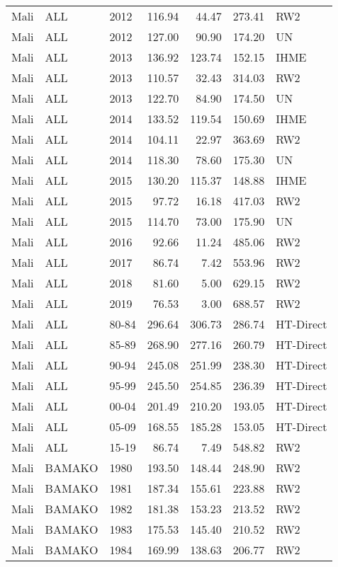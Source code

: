 \begin{longtable}{lllrrrl}
  Mali & ALL & 2012 & 116.94 & 44.47 & 273.41 & RW2 \\ 
  Mali & ALL & 2012 & 127.00 & 90.90 & 174.20 & UN \\ 
  Mali & ALL & 2013 & 136.92 & 123.74 & 152.15 & IHME \\ 
  Mali & ALL & 2013 & 110.57 & 32.43 & 314.03 & RW2 \\ 
  Mali & ALL & 2013 & 122.70 & 84.90 & 174.50 & UN \\ 
  Mali & ALL & 2014 & 133.52 & 119.54 & 150.69 & IHME \\ 
  Mali & ALL & 2014 & 104.11 & 22.97 & 363.69 & RW2 \\ 
  Mali & ALL & 2014 & 118.30 & 78.60 & 175.30 & UN \\ 
  Mali & ALL & 2015 & 130.20 & 115.37 & 148.88 & IHME \\ 
  Mali & ALL & 2015 & 97.72 & 16.18 & 417.03 & RW2 \\ 
  Mali & ALL & 2015 & 114.70 & 73.00 & 175.90 & UN \\ 
  Mali & ALL & 2016 & 92.66 & 11.24 & 485.06 & RW2 \\ 
  Mali & ALL & 2017 & 86.74 & 7.42 & 553.96 & RW2 \\ 
  Mali & ALL & 2018 & 81.60 & 5.00 & 629.15 & RW2 \\ 
  Mali & ALL & 2019 & 76.53 & 3.00 & 688.57 & RW2 \\ 
  Mali & ALL & 80-84 & 296.64 & 306.73 & 286.74 & HT-Direct \\ 
  Mali & ALL & 85-89 & 268.90 & 277.16 & 260.79 & HT-Direct \\ 
  Mali & ALL & 90-94 & 245.08 & 251.99 & 238.30 & HT-Direct \\ 
  Mali & ALL & 95-99 & 245.50 & 254.85 & 236.39 & HT-Direct \\ 
  Mali & ALL & 00-04 & 201.49 & 210.20 & 193.05 & HT-Direct \\ 
  Mali & ALL & 05-09 & 168.55 & 185.28 & 153.05 & HT-Direct \\ 
  Mali & ALL & 15-19 & 86.74 & 7.49 & 548.82 & RW2 \\ 
  Mali & BAMAKO & 1980 & 193.50 & 148.44 & 248.90 & RW2 \\ 
  Mali & BAMAKO & 1981 & 187.34 & 155.61 & 223.88 & RW2 \\ 
  Mali & BAMAKO & 1982 & 181.38 & 153.23 & 213.52 & RW2 \\ 
  Mali & BAMAKO & 1983 & 175.53 & 145.40 & 210.52 & RW2 \\ 
  Mali & BAMAKO & 1984 & 169.99 & 138.63 & 206.77 & RW2 \\ 

\end{longtable}
